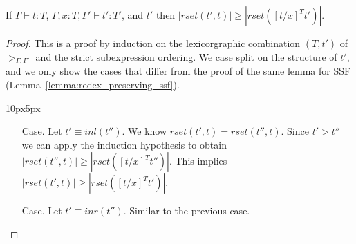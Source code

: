 \begin{lemma}
  \label{lemma:redex_preserving_ssfp}
  \small
  If $\Gamma \vdash t : T$, $\Gamma, x:T, \Gamma' \vdash t':T'$, and
  $t'$ then $|rset(t', t)| \geq |rset([t/x]^T t')|$.
\end{lemma}
\begin{proof}
  This is a proof by induction on the lexicorgraphic combination
  $(T, t')$ of $>_{\Gamma,\Gamma'}$ and the strict subexpression
  ordering.  We case split on the structure of $t'$, and we only show
  the cases that differ from the proof of the same lemma for SSF\\
  (Lemma~\ref{lemma:redex_preserving_ssf}).
\vspace{-25px}
\begin{changemargin}{10px}{5px}\noindent
\begin{itemize}  
  
\item[Case.] Let $t' \equiv inl(t'')$. We know $rset(t', t) = rset(t'', t)$.  Since $t' > t''$ we can apply
  the induction hypothesis to obtain $|rset(t'', t)| \geq |rset([t/x]^T t'')|$.  This implies
  $|rset(t', t)| \geq |rset([t/x]^T t')|$.
  
\item[Case.] Let $t' \equiv inr(t'')$. Similar to the previous case.  
  

\end{itemize}
\end{changemargin}
\end{proof}
